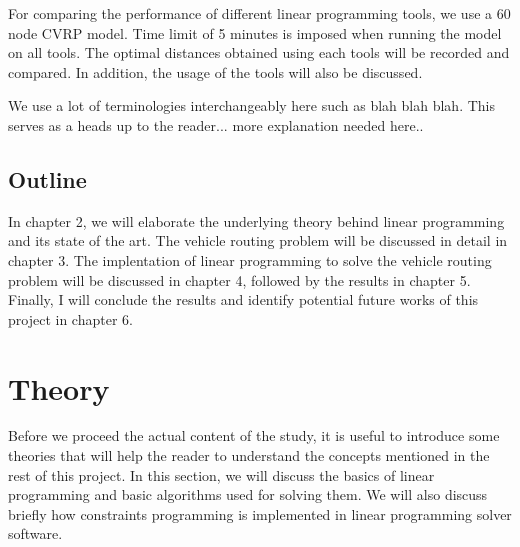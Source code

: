 \documentclass[a4paper, 12pt]{report}
\begin{document}
For comparing the performance of different linear programming tools, we use a 60 node CVRP model. Time limit of 5 minutes is imposed
when running the model on all tools. The optimal distances obtained using each tools will be recorded and compared. In addition, the usage
of the tools will also be discussed.

We use a lot of terminologies interchangeably here such as blah blah blah. This serves as a heads up to the reader... more explanation needed here..

\section{Outline}
In chapter 2, we will elaborate the underlying theory behind linear programming and its state of the art.
The vehicle routing problem will be discussed in detail in chapter 3. The implentation of linear programming to solve the vehicle routing problem will be
discussed in chapter 4, followed by the results in chapter 5. Finally, I will conclude the results and identify potential future works
of this project in chapter 6.

\chapter{Theory}
Before we proceed the actual content of the study, it is useful to introduce some theories that will help the reader
to understand the concepts mentioned in the rest of this project. In this section, we will discuss the basics of
linear programming and basic algorithms used for solving them. We will
also discuss briefly how constraints programming is implemented in linear programming solver software.
\end{document}
